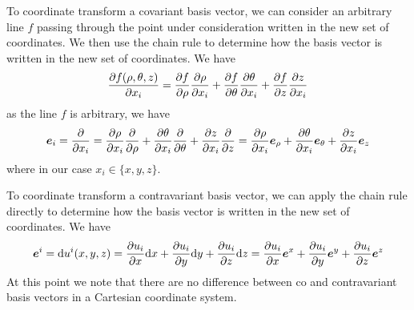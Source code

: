 To coordinate transform a covariant basis vector, we can consider an arbitrary line $f$ passing through the point under consideration written in the new set of coordinates.
We then use the chain rule to determine how the basis vector is written in the new set of coordinates.
We have
%
\begin{align*}
    \frac{\partial {f(\rho, \theta, z)}}{\partial{x_i}}
    =
    \frac{\partial {f}}{\partial{\rho}} \frac{\partial {\rho}}{\partial{x_i}}
    + \frac{\partial {f}}{\partial{\theta}} \frac{\partial {\theta}}{\partial{x_i}}
    + \frac{\partial {f}}{\partial{z}} \frac{\partial {z}}{\partial{x_i}}
\end{align*}
%
as the line $f$ is arbitrary, we have
%
\begin{align*}
    \boldsymbol{e}_i
    =
    \frac{\partial {}}{\partial{x_i}}
    =
    \frac{\partial {\rho}}{\partial{x_i}} \frac{\partial {}}{\partial{\rho}}
    + \frac{\partial {\theta}}{\partial{x_i}} \frac{\partial {}}{\partial{\theta}}
    + \frac{\partial {z}}{\partial{x_i}} \frac{\partial {}}{\partial{z}}
    =
    \frac{\partial {\rho}}{\partial{x_i}} \boldsymbol{e}_{\rho}
    + \frac{\partial {\theta}}{\partial{x_i}} \boldsymbol{e}_{\theta}
    + \frac{\partial {z}}{\partial{x_i}} \boldsymbol{e}_{z}
\end{align*}
%
where in our case $x_i \in \{x,y,z\}$.

To coordinate transform a contravariant basis vector, we can apply the chain rule directly to determine how the basis vector is written in the new set of coordinates.
We have
%
\begin{align*}
    \boldsymbol{e}^i
    =
    \text{d} u^i(x,y,z)
    =
    \frac{\partial {u_i}}{\partial{x}}\text{d} x
    + \frac{\partial {u_i}}{\partial{y}}\text{d} y
    + \frac{\partial {u_i}}{\partial{z}}\text{d} z
    =
    \frac{\partial {u_i}}{\partial{x}}\boldsymbol{e}^x
    + \frac{\partial {u_i}}{\partial{y}}\boldsymbol{e}^y
    + \frac{\partial {u_i}}{\partial{z}}\boldsymbol{e}^z
\end{align*}
%
At this point we note that there are no difference between co and contravariant basis vectors in a Cartesian coordinate system.


